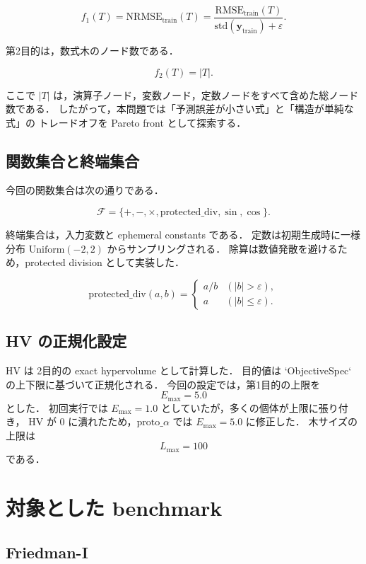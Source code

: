\documentclass[a4paper,11pt]{ltjsarticle}
\newcommand{\HV}{\mathrm{HV}}
\newcommand{\NRMSE}{\mathrm{NRMSE}}
\begin{document}
\[
  f_1(T)
  =
  \NRMSE_{\mathrm{train}}(T)
  =
  \frac{
    \mathrm{RMSE}_{\mathrm{train}}(T)
  }{
    \mathrm{std}(\bm{y}_{\mathrm{train}})+\varepsilon
  }.
\]

第2目的は，数式木のノード数である．

\[
  f_2(T)=|T|.
\]

ここで \(|T|\) は，演算子ノード，変数ノード，定数ノードをすべて含めた総ノード数である．
したがって，本問題では「予測誤差が小さい式」と「構造が単純な式」の
トレードオフを Pareto front として探索する．

\subsection{関数集合と終端集合}

今回の関数集合は次の通りである．

\[
  \mathcal{F}
  =
  \{+, -, \times, \mathrm{protected\_div}, \sin, \cos\}.
\]

終端集合は，入力変数と ephemeral constants である．
定数は初期生成時に一様分布 \(\mathrm{Uniform}(-2,2)\) からサンプリングされる．
除算は数値発散を避けるため，protected division として実装した．

\[
\mathrm{protected\_div}(a,b)
=
\begin{cases}
  a/b & (|b|>\varepsilon),\\
  a   & (|b|\leq \varepsilon).
\end{cases}
\]

\subsection{HV の正規化設定}

\(\HV\) は 2目的の exact hypervolume として計算した．
目的値は `ObjectiveSpec` の上下限に基づいて正規化される．
今回の設定では，第1目的の上限を
\[
  E_{\max}=5.0
\]
とした．
初回実行では \(E_{\max}=1.0\) としていたが，多くの個体が上限に張り付き，
\(\HV\) が 0 に潰れたため，\(\mathrm{proto}\_\alpha\) では \(E_{\max}=5.0\) に修正した．
木サイズの上限は
\[
  L_{\max}=100
\]
である．

\section{対象とした benchmark}

\subsection{Friedman-I}
\end{document}
